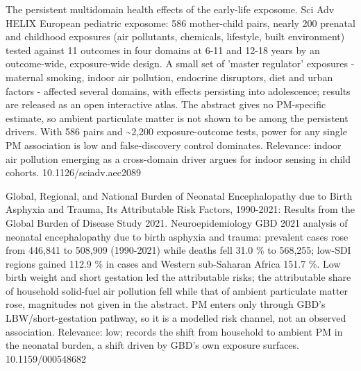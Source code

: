 \documentclass[10pt]{article}
\begin{document}
{The persistent multidomain health effects of the early-life exposome.}
{Sci Adv}
{HELIX European pediatric exposome: 586 mother-child pairs, nearly 200 prenatal and childhood exposures (air pollutants, chemicals, lifestyle, built environment) tested against 11 outcomes in four domains at 6-11 and 12-18 years by an outcome-wide, exposure-wide design. A small set of 'master regulator' exposures - maternal smoking, indoor air pollution, endocrine disruptors, diet and urban factors - affected several domains, with effects persisting into adolescence; results are released as an open interactive atlas. The abstract gives no PM-specific estimate, so ambient particulate matter is not shown to be among the persistent drivers. With 586 pairs and \textasciitilde{}2,200 exposure-outcome tests, power for any single PM association is low and false-discovery control dominates. Relevance: indoor air pollution emerging as a cross-domain driver argues for indoor sensing in child cohorts.}
{10.1126/sciadv.aec2089}

{Global, Regional, and National Burden of Neonatal Encephalopathy due to Birth Asphyxia and Trauma, Its Attributable Risk Factors, 1990-2021: Results from the Global Burden of Disease Study 2021.}
{Neuroepidemiology}
{GBD 2021 analysis of neonatal encephalopathy due to birth asphyxia and trauma: prevalent cases rose from 446,841 to 508,909 (1990-2021) while deaths fell 31.0 \% to 568,255; low-SDI regions gained 112.9 \% in cases and Western sub-Saharan Africa 151.7 \%. Low birth weight and short gestation led the attributable risks; the attributable share of household solid-fuel air pollution fell while that of ambient particulate matter rose, magnitudes not given in the abstract. PM enters only through GBD's LBW/short-gestation pathway, so it is a modelled risk channel, not an observed association. Relevance: low; records the shift from household to ambient PM in the neonatal burden, a shift driven by GBD's own exposure surfaces.}
{10.1159/000548682}

\par{}\baselineskip{}\baselineskip
{}
\end{document}
